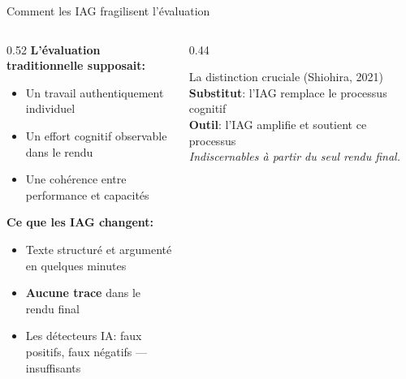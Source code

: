 \begin{frame}{Comment les IAG fragilisent l'évaluation}
  \begin{columns}[T]
    \begin{column}{0.52\textwidth}
      \textbf{L'évaluation traditionnelle supposait:}
      \begin{itemize}
        \item Un travail authentiquement individuel
        \item Un effort cognitif observable dans le rendu
        \item Une cohérence entre performance et capacités
      \end{itemize}
      \vspace{0.6em}
      \textbf{Ce que les IAG changent:}
      \begin{itemize}
        \item Texte structuré et argumenté en quelques minutes
        \item \textbf{Aucune trace} dans le rendu final
        \item Les détecteurs IA: faux positifs, faux négatifs --- insuffisants
      \end{itemize}
    \end{column}
    \begin{column}{0.44\textwidth}
      \begin{alertblock}{La distinction cruciale (Shiohira, 2021)}
        \textbf{Substitut}: l'IAG remplace le processus cognitif\\[0.3em]
        \textbf{Outil}: l'IAG amplifie et soutient ce processus\\[0.5em]
        \emph{Indiscernables à partir du seul rendu final.}
      \end{alertblock}
    \end{column}
  \end{columns}
\end{frame}


